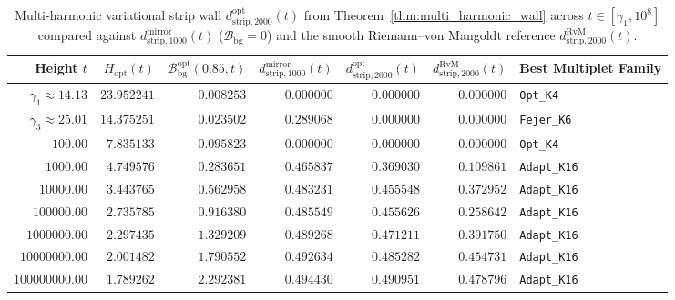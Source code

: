 \documentclass[11pt,reqno]{amsart}
\theoremstyle{definition}
\theoremstyle{remark}
\numberwithin{equation}{section}
\begin{document}
\begin{table}[t]
\centering
\caption{Multi-harmonic variational strip wall $d_{\mathrm{strip},2000}^{\mathrm{opt}}(t)$ from Theorem~\ref{thm:multi_harmonic_wall} across $t \in [\gamma_1, 10^8]$ compared against $d_{\mathrm{strip},1000}^{\mathrm{mirror}}(t)$ ($\mathcal{B}_{\mathrm{bg}} = 0$) and the smooth Riemann--von Mangoldt reference $d_{\mathrm{strip},2000}^{\mathrm{RvM}}(t)$.}\label{tab:multi_harmonic_wall}
\footnotesize
\setlength{\tabcolsep}{5.2pt}
\begin{tabular}{@{}rrrrrrl@{}}
\toprule
Height $t$ & $H_{\mathrm{opt}}(t)$ & $\mathcal{B}_{\mathrm{bg}}^{\mathrm{opt}}(0.85, t)$ & $d_{\mathrm{strip},1000}^{\mathrm{mirror}}(t)$ & $d_{\mathrm{strip},2000}^{\mathrm{opt}}(t)$ & $d_{\mathrm{strip},2000}^{\mathrm{RvM}}(t)$ & Best Multiplet Family \\
\midrule
$\gamma_1 \approx 14.13$ & $23.952241$ & $0.008253$ & $0.000000$ & $0.000000$ & $0.000000$ & \texttt{Opt\_K4} \\
$\gamma_3 \approx 25.01$ & $14.375251$ & $0.023502$ & $0.289068$ & $0.000000$ & $0.000000$ & \texttt{Fejer\_K6} \\
$100.00$                 & $7.835133$  & $0.095823$ & $0.000000$ & $0.000000$ & $0.000000$ & \texttt{Opt\_K4} \\
$1000.00$                & $4.749576$  & $0.283651$ & $0.465837$ & $0.369030$ & $0.109861$ & \texttt{Adapt\_K16} \\
$10000.00$               & $3.443765$  & $0.562958$ & $0.483231$ & $0.455548$ & $0.372952$ & \texttt{Adapt\_K16} \\
$100000.00$              & $2.735785$  & $0.916380$ & $0.485549$ & $0.455626$ & $0.258642$ & \texttt{Adapt\_K16} \\
$1000000.00$             & $2.297435$  & $1.329209$ & $0.489268$ & $0.471211$ & $0.391750$ & \texttt{Adapt\_K16} \\
$10000000.00$            & $2.001482$  & $1.790552$ & $0.492634$ & $0.485282$ & $0.454731$ & \texttt{Adapt\_K16} \\
$100000000.00$           & $1.789262$  & $2.292381$ & $0.494430$ & $0.490951$ & $0.478796$ & \texttt{Adapt\_K16} \\
\bottomrule
\end{tabular}
\end{table}
\end{document}
